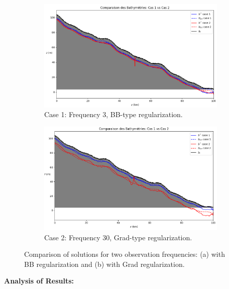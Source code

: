 \documentclass{article}
\begin{document}
\begin{figure}[H]
    \centering
    \begin{subfigure}[b]{0.48\textwidth}
        \centering
        \includegraphics[width=\linewidth]{Images_Ayoub/Test_Cases_Tasks/Monitored/3/Pasted image.png}
        \caption{Case 1: Frequency 3, BB-type regularization.}
        \label{fig:cas1}
    \end{subfigure}
    \hfill
    \begin{subfigure}[b]{0.48\textwidth}
        \centering
        \includegraphics[width=\linewidth]{Images_Ayoub/Test_Cases_Tasks/Monitored/30/Pasted image.png}
        \caption{Case 2: Frequency 30, Grad-type regularization.}
        \label{fig:cas2}
    \end{subfigure}
    \caption{Comparison of solutions for two observation frequencies: (a) with BB regularization and (b) with Grad regularization.}
    \label{fig:comparison}
\end{figure}

\noindent\textbf{Analysis of Results:}
\end{document}

